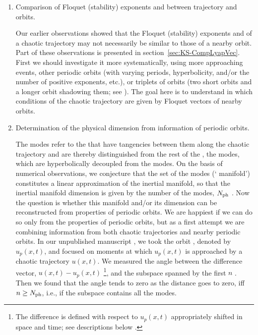 \begin{enumerate}
\item Comparison of Floquet (stability) exponents and {\cLvs} between trajectory and orbits.

  Our earlier observations showed that the Floquet (stability) exponents and {\cLvs}
  of a chaotic trajectory may not necessarily be similar to
  those of a nearby orbit.
  Part of these observations is presented in section~\ref{sec:KS-CompLyapVec}.
  First we should investigate it more systematically,
  using more approaching events, other periodic orbits
  (with varying periods, hyperbolicity,
  and/or the number of positive exponents, etc.),
  or triplets of orbits
  (two short orbits and a longer orbit shadowing them;
  see ).
  The goal here is to understand in which conditions {\cLvs}
  of the chaotic trajectory are given by Floquet vectors of nearby orbits.


\item Determination of the physical dimension from information of periodic orbits.

  The {\entangled} modes refer to the {\cLvs}
  that have tangencies between them along the chaotic trajectory
  and are thereby distinguished from the rest of the {\cLvs},
  the {\transient} modes,
  which are hyperbolically decoupled from the {\entangled} modes.
  On the basis of numerical observations,
  we conjecture that the set of the {\entangled} modes (`{\entangled} manifold')
  constitutes a linear approximation of the inertial manifold, so that
  the inertial manifold dimension is given by the number of the {\entangled} modes,
  $N_{\rm ph}$ \cite{YaTaGiChRa08,TaGiCh11}.
  Now the question is whether this {\entangled} manifold and/or its dimension
  can be reconstructed from properties of periodic orbits.
  We are happiest if we can do so only from the properties of periodic orbits,
  but as a first attempt we are combining information
  from both chaotic trajectories and nearby periodic orbits.
  In our unpublished manuscript \cite{TaCh11}, we took the orbit ,
  denoted by $u_p(x,t)$,
  and focused on moments at which $u_p(x,t)$ is approached
  by a chaotic trajectory $u(x,t)$.
  We measured the angle between the difference vector, $u(x,t) - u_p(x,t)$
  \footnote{
    The difference {\cLv} is defined with respect to $u_p(x,t)$
    appropriately shifted in space and time;
    see descriptions below .
  }, and the subspace spanned by the first $n$ {\cLvs}.
  Then we found that the angle tends to zero as the distance goes to zero,
  iff $n \geq N_{\rm ph}$, i.e., if the subspace contains
  all the {\entangled} modes.


\end{enumerate}
